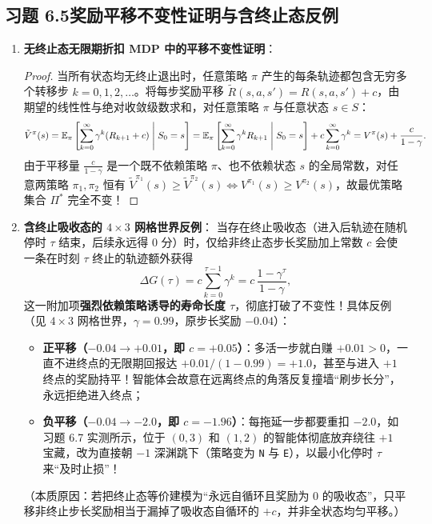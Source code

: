 \subsection*{习题 6.5\quad 奖励平移不变性证明与含终止态反例}
\begin{enumerate}[label=(\arabic*), leftmargin=1.8em]
  \item \textbf{无终止态无限期折扣 MDP 中的平移不变性证明}：
  \begin{proof}
  当所有状态均无终止退出时，任意策略 $\pi$ 产生的每条轨迹都包含无穷多个转移步 $k = 0, 1, 2, \dots$。将每步奖励平移 $\tilde{R}(s,a,s') = R(s,a,s') + c$，由期望的线性性与绝对收敛级数求和，对任意策略 $\pi$ 与任意状态 $s \in S$：
  \[
    \tilde{V}^\pi(s) = \mathbb{E}_\pi\left[\sum_{k=0}^{\infty} \gamma^k (R_{k+1} + c) \;\middle|\; S_0 = s\right]
    = \mathbb{E}_\pi\left[\sum_{k=0}^{\infty} \gamma^k R_{k+1} \;\middle|\; S_0 = s\right] + c \sum_{k=0}^{\infty} \gamma^k
    = V^\pi(s) + \frac{c}{1 - \gamma}.
  \]
  由于平移量 $\frac{c}{1-\gamma}$ 是一个既不依赖策略 $\pi$、也不依赖状态 $s$ 的全局常数，对任意两策略 $\pi_1, \pi_2$ 恒有 $\tilde{V}^{\pi_1}(s) \ge \tilde{V}^{\pi_2}(s) \iff V^{\pi_1}(s) \ge V^{\pi_2}(s)$，故最优策略集合 $\Pi^*$ 完全不变！
  \end{proof}
  \item \textbf{含终止吸收态的 $4\times 3$ 网格世界反例}：
  当存在终止吸收态（进入后轨迹在随机停时 $\tau$ 结束，后续永远得 $0$ 分）时，仅给非终止态步长奖励加上常数 $c$ 会使一条在时刻 $\tau$ 终止的轨迹额外获得
  \[
    \Delta G(\tau) = c \sum_{k=0}^{\tau - 1} \gamma^k = c\,\frac{1 - \gamma^\tau}{1 - \gamma},
  \]
  这一附加项\textbf{强烈依赖策略诱导的寿命长度 $\tau$}，彻底打破了不变性！具体反例（见 $4\times 3$ 网格世界，$\gamma = 0.99$，原步长奖励 $-0.04$）：
  \begin{itemize}
    \item \textbf{正平移（$-0.04 \to +0.01$，即 $c = +0.05$）}：多活一步就白赚 $+0.01 > 0$，一直不进终点的无限期回报达 $+0.01 / (1-0.99) = +1.0$，甚至与进入 $+1$ 终点的奖励持平！智能体会故意在远离终点的角落反复撞墙“刷步长分”，永远拒绝进入终点；
    \item \textbf{负平移（$-0.04 \to -2.0$，即 $c = -1.96$）}：每拖延一步都要重扣 $-2.0$，如习题 6.7 实测所示，位于 $(0,3)$ 和 $(1,2)$ 的智能体彻底放弃绕往 $+1$ 宝藏，改为直接朝 $-1$ 深渊跳下（策略变为 \texttt{N} 与 \texttt{E}），以最小化停时 $\tau$ 来“及时止损”！
  \end{itemize}
  （本质原因：若把终止态等价建模为“永远自循环且奖励为 $0$ 的吸收态”，只平移非终止步长奖励相当于漏掉了吸收态自循环的 $+c$，并非全状态均匀平移。）
\end{enumerate}

